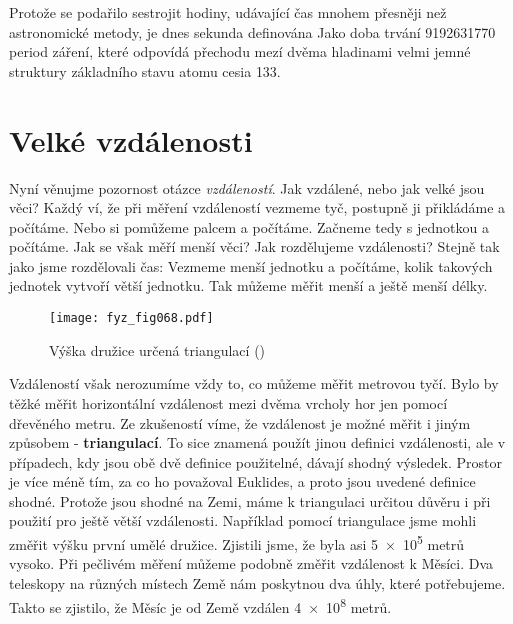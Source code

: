 {    Protože se podařilo sestrojit hodiny, udávající čas mnohem přesněji než astronomické metody, 
    je dnes sekunda definována Jako doba trvání \num{9192631770} period záření, které odpovídá 
    přechodu mezí dvěma hladinami velmi jemné struktury základního stavu atomu cesia \num{133}.
    
  \section{Velké vzdálenosti}
    Nyní věnujme pozornost otázce \emph{vzdáleností}. Jak vzdálené, nebo jak velké jsou věci? Každý 
    ví, že při měření vzdáleností vezmeme tyč, postupně ji přikládáme a počítáme. Nebo si pomůžeme 
    palcem a počítáme. Začneme tedy s jednotkou a počítáme. Jak se však měří menší věci? Jak 
    rozdělujeme vzdálenosti? Stejně tak jako jsme rozdělovali čas: Vezmeme menší jednotku a 
    počítáme, kolik takových jednotek vytvoří větší jednotku. Tak můžeme měřit menší a ještě menší 
    délky.

    \begin{figure}[ht!]  %
      \centering
      \texttt{[image: fyz\_fig068.pdf]}
      \caption{Výška družice určená triangulací (\cite[s.~70]{Feynman01})}
      \label{fyz:fig068}
    \end{figure}
    
    Vzdáleností však nerozumíme vždy to, co můžeme měřit metrovou tyčí. Bylo by těžké měřit 
    horizontální vzdálenost mezi dvěma vrcholy hor jen pomocí dřevěného metru. Ze zkušeností víme, 
    že vzdálenost je možné měřit i jiným způsobem - \textbf{triangulací}. To sice znamená použít 
    jinou definici vzdálenosti, ale v případech, kdy jsou obě dvě definice použitelné, dávají 
    shodný výsledek. Prostor je více méně tím, za co ho považoval Euklides, a proto jsou uvedené 
    definice shodné. Protože jsou shodné na Zemi, máme k triangulaci určitou důvěru i při použití 
    pro ještě větší vzdálenosti. Například pomocí triangulace jsme mohli změřit výšku první umělé 
    družice. Zjistili jsme, že byla asi \num{5e5} metrů vysoko. Při pečlivém měření můžeme podobně 
    změřit vzdálenost k Měsíci. Dva teleskopy na různých místech Země nám poskytnou dva úhly, které 
    potřebujeme. Takto se zjistilo, že Měsíc je od Země vzdálen \num{4e8} metrů.
    
}
